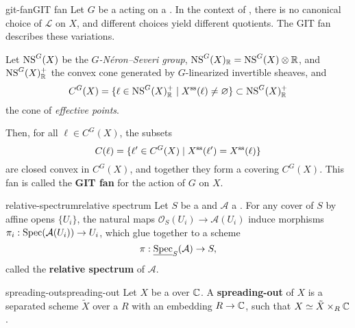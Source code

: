 \begin{topic}{git-fan}{GIT fan}
    Let $G$ be a  acting on a  . In the context of , there is no canonical choice of   $\mathcal{L}$ on $X$, and different choices yield different quotients. The GIT fan describes these variations.
    
    Let $\textup{NS}^G(X)$ be the \textit{$G$-Néron--Severi group}, $\textup{NS}^G(X)_{\mathbb{R}} = \textup{NS}^G(X) \otimes \mathbb{R}$, and $\textup{NS}^G(X)_{\mathbb{R}}^+$ the convex cone generated by  $G$-linearized invertible sheaves, and
    \[ C^G(X) = \{ \ell \in \textup{NS}^G(X)_{\mathbb{R}}^+ \;|\; X^\textup{ss}(\ell) \ne \varnothing \} \subset \textup{NS}^G(X)_{\mathbb{R}}^+ \]
    the cone of \textit{effective points}.
    
    Then, for all $\ell \in C^G(X)$, the subsets
    \[ C(\ell) = \{ \ell' \in C^G(X) \;|\; X^\textup{ss}(\ell') = X^\textup{ss}(\ell) \} \]
    are closed convex  in $C^G(X)$, and together they form a  covering $C^G(X)$. This fan is called the \textbf{GIT fan} for the action of $G$ on $X$.
\end{topic}

\begin{topic}{relative-spectrum}{relative spectrum}
    Let $S$ be a  and $\mathcal{A}$ a  . For any cover of $S$ by affine opens $\{ U_i \}$, the natural maps $\mathcal{O}_S(U_i) \to \mathcal{A}(U_i)$ induce morphisms $\pi_i : \operatorname{Spec}(\mathcal{A}(U_i)) \to U_i$, which glue together to a scheme
    \[ \pi : \underline{\operatorname{Spec}}_S(\mathcal{A}) \to S , \]
    called the \textbf{relative spectrum} of $\mathcal{A}$.
\end{topic}

\begin{topic}{spreading-out}{spreading-out}
    Let $X$ be a  over $\mathbb{C}$. A \textbf{spreading-out} of $X$ is a separated scheme $\tilde{X}$ over a  $R$ with an embedding $R \to \mathbb{C}$, such that $X \simeq \tilde{X} \times_R \mathbb{C}$.
\end{topic}

